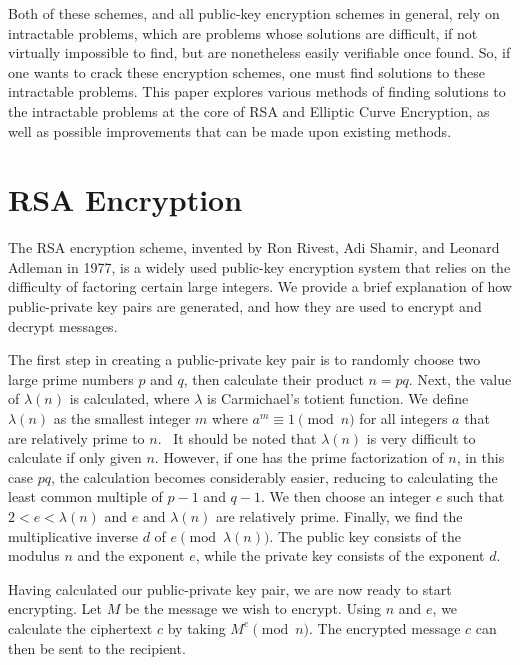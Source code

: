 \documentclass[letterpaper,twocolumn,12pt]{article}
\begin{document}
    Both of these schemes, and all public-key encryption schemes in general,
    rely on intractable problems, which are problems whose solutions are
    difficult, if not virtually impossible to find, but are nonetheless easily
    verifiable once found.
    So, if one wants to crack these encryption schemes, one must find solutions
    to these intractable problems.
    This paper explores various methods of finding solutions to the intractable
    problems at the core of RSA and Elliptic Curve Encryption, as well as
    possible improvements that can be made upon existing methods.

    \section*{RSA Encryption}

    The RSA encryption scheme, invented by Ron Rivest, Adi Shamir, and Leonard
    Adleman in 1977, is a widely used public-key encryption system that relies
    on the difficulty of factoring certain large integers. We provide a brief
    explanation of how public-private key pairs are generated, and how they
    are used to encrypt and decrypt messages.
    
    The first step in creating a public-private key pair is to randomly choose
    two large prime numbers \( p \) and \( q \), then calculate their product
    \( n = pq \). Next, the value of \( \lambda(n) \) is calculated, where
    \( \lambda \) is Carmichael's totient function. We define \( \lambda(n) \)
    as the smallest integer \( m \) where \( a^m \equiv 1 \pmod{n} \) for all
    integers \( a \) that are relatively prime to \( n \).~\cite{WA:Carmichael}
    It should be noted that \( \lambda(n) \) is very difficult to calculate if
    only given \( n \). However, if one has the prime factorization of \( n \),
    in this case \( pq \), the calculation becomes considerably easier, reducing
    to calculating the least common multiple of \( p - 1 \) and \( q - 1\). We
    then choose an integer \( e \) such that \( 2 < e < \lambda(n) \) and
    \( e \) and \( \lambda(n) \) are relatively prime.
    Finally, we find the
    multiplicative inverse \( d \) of \( e \pmod{\lambda(n)} \).
    The public key consists of the modulus \( n \)
    and the exponent \( e \), while the private key consists of the exponent
    \( d \).

    Having calculated our public-private key pair, we are now ready to start
    encrypting. Let \( M \) be the message we wish to encrypt. Using \( n \)
    and \( e \), we calculate the ciphertext \( c \) by taking
    \( M^e \pmod{n} \). The encrypted message \( c \) can then be sent to the
    recipient.
\end{document}
